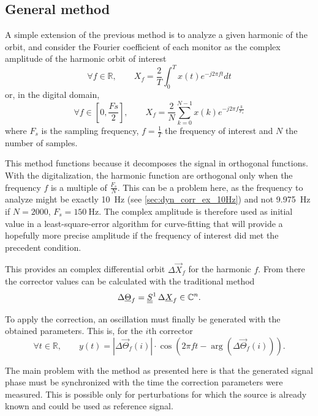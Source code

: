 \subsection{General method}

A simple extension of the previous method is to analyze a given harmonic of the orbit, and consider the Fourier coefficient of each monitor as the complex amplitude of the harmonic orbit of interest
\begin{equation}
	\label{eq:orbit_extract}
	\forall f \in \mathbb{R}, \qquad X_f = \frac{2}{T} \int_0^T x(t) e^{-j 2 \pi f t} dt
\end{equation}
or, in the digital domain,
\begin{equation}
\forall f \in \left[0, \frac{Fs}{2}\right], \qquad X_f = \frac{2}{N} \sum\limits_{k=0}^{N-1} x(k) e^{-j 2 \pi f \frac{k}{F_s}}
\end{equation}
where $F_s$ is the sampling frequency, $f = \frac{1}{T}$ the frequency of interest and $N$ the number of samples.

This method functions because it decomposes the signal in orthogonal functions. With the digitalization, the harmonic function are orthogonal only when the frequency $f$ is a multiple of $\frac{F_s}{N}$. This can be a problem here, as the frequency to analyze might be exactly \SI{10}{\hertz} (see \cref{sec:dyn_corr_ex_10Hz}) and not \SI{9.975}{\hertz} if $N=2000$, $F_s=\SI{150}{\hertz}$. The complex amplitude is therefore used as initial value in a least-square-error algorithm for curve-fitting that will provide a hopefully more precise amplitude if the frequency of interest did met the precedent condition.

This provides an complex differential orbit $\Delta\vec{X}_f$ for the harmonic $f$. From there the corrector values can be calculated with the traditional method
\begin{equation}
\Delta\underline{\Theta}_f = \underline{\underline{S}}^{1}\, \Delta\underline{X}_f   \in \mathbb{C}^n.
\end{equation}

To apply the correction, an oscillation must finally be generated with the obtained parameters. This is, for the $i$th corrector
\begin{equation}\label{eq:th_dyn_corr}
\forall t \in  \mathbb{R}, \qquad y(t) = \left| \Delta\vec{\Theta}_f(i) \right| \cdot \cos\left(2 \pi f t - \arg\left(\Delta\vec{\Theta}_f(i)\right)\right).
\end{equation}

The main problem with the method as presented here is that the generated signal phase must be synchronized with the time the correction parameters were measured. This is possible only for perturbations for which the source is already known and could be used as reference signal.

